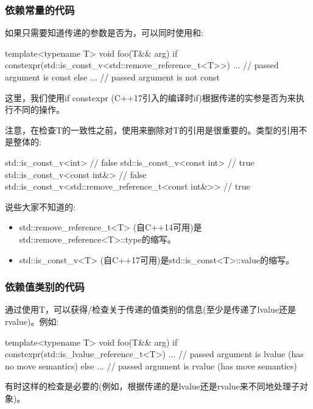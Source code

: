 \subsubsection{依赖常量的代码}

如果只需要知道传递的参数是否为，可以同时使用和:

\begin{cppcode}
template<typename T>
void foo(T&& arg)
{
	if constexpr(std::is_const_v<std::remove_reference_t<T>>) {
		... // passed argument is const
	}
	else {
		... // passed argument is not const
	}
}
\end{cppcode}

这里，我们使用if constexpr (C++17引入的编译时if)根据传递的实参是否为来执行不同的操作。

注意，在检查T的一致性之前，使用来删除对T的引用是很重要的。类型的引用不是整体的:

\begin{cppcode}
std::is_const_v<int> // false
std::is_const_v<const int> // true
std::is_const_v<const int&> // false
std::is_const_v<std::remove_reference_t<const int&>> // true
\end{cppcode}

说些大家不知道的:

\begin{itemize}
	\item std::remove_reference_t<T> (自C++14可用)是std::remove_reference<T>::type的缩写。
	\item std::is_const_v<T> (自C++17可用)是std::is_const<T>::value的缩写。
\end{itemize}

\subsubsection{依赖值类别的代码}

通过使用T，可以获得/检查关于传递的值类别的信息(至少是传递了lvalue还是rvalue)。例如:

\begin{cppcode}
template<typename T>
void foo(T&& arg)
{
	if constexpr(std::is_lvalue_reference_t<T>) {
		... // passed argument is lvalue (has no move semantics)
	}
	else {
		... // passed argument is rvalue (has move semantics)
	}
}
\end{cppcode}

有时这样的检查是必要的(例如，根据传递的是lvalue还是rvalue来不同地处理子对象)。

